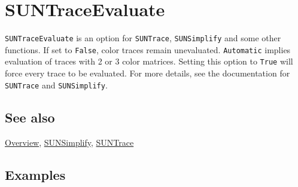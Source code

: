 \documentclass[../FeynCalcManual.tex]{subfiles}
\begin{document}
\hypertarget{suntraceevaluate}{
\section{SUNTraceEvaluate}\label{suntraceevaluate}}

\texttt{SUNTraceEvaluate} is an option for \texttt{SUNTrace},
\texttt{SUNSimplify} and some other functions. If set to \texttt{False},
color traces remain unevaluated. \texttt{Automatic} implies evaluation
of traces with 2 or 3 color matrices. Setting this option to
\texttt{True} will force every trace to be evaluated. For more details,
see the documentation for \texttt{SUNTrace} and \texttt{SUNSimplify}.

\subsection{See also}

\hyperlink{toc}{Overview}, \hyperlink{sunsimplify}{SUNSimplify},
\hyperlink{suntrace}{SUNTrace}

\subsection{Examples}
\end{document}
